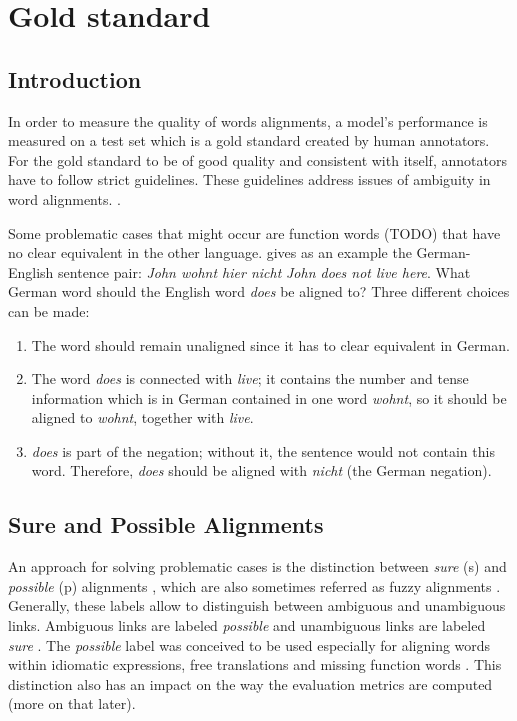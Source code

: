 \chapter{Gold standard}
\section{Introduction}
In order to measure the quality of words alignments, a model's performance is measured on a test set which is a gold standard created by human annotators. 
For the gold standard to be of good quality and consistent with itself, annotators have to follow strict guidelines.
These guidelines address issues of ambiguity in word alignments. \autocite[115]{koehn2009}. 

Some problematic cases that might occur are function words (TODO) that have no clear equivalent in the other language. 
\cite{koehn2009} gives as an example the German-English sentence pair: \emph{John wohnt hier nicht}  \emph{John does not live here}. 
What German word should the English word \emph{does} be aligned to? 
Three different choices can be made:
\begin{enumerate}
	\item The word should remain unaligned since it has to clear equivalent in German.
	\item The word \emph{does} is connected with \emph{live}; it contains the number and tense information which is in German contained in one word \emph{wohnt}, so it should be aligned to \emph{wohnt}, together with \emph{live}.
	\item \emph{does} is part of the negation; without it, the sentence would not contain this word. Therefore, \emph{does} should be aligned with \emph{nicht} (the German negation).
\end{enumerate}

\section{Sure and Possible Alignments}
An approach for solving problematic cases is the distinction between \emph{sure} (s) and \emph{possible} (p) alignments \autocite{och-ney-2000-improved}, which are also sometimes referred as fuzzy alignments \autocite{clematide2018}. 
Generally, these labels allow to distinguish between ambiguous and unambiguous links. 
Ambiguous links are labeled \emph{possible} and unambiguous links are labeled \emph{sure} \autocite{lambert2005}. 
The \emph{possible} label was conceived to be used especially for aligning words within idiomatic expressions, free translations and missing function words \autocite{och-ney-2000-improved}.
This distinction also has an impact on the way the evaluation metrics are computed (more on that later).

